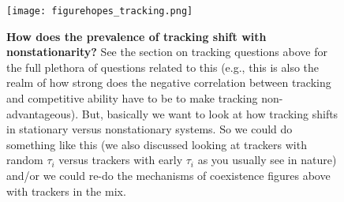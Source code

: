 \documentclass[11pt,a4paper,oneside]{article}
\begin{document}
\newpage
\begin{figure}[h!]
\centering
\noindent \texttt{[image: figurehopes\_tracking.png]}
\caption{{\bf How does the prevalence of tracking shift with nonstationarity?} See the section on tracking questions above for the full plethora of questions related to this (e.g., this is also the realm of how strong does the negative correlation between tracking and competitive ability have to be to make tracking non-advantageous). But, basically we want to look at how tracking shifts in stationary versus nonstationary systems. So we could do something like this (we also discussed looking at trackers with random \(\tau_{i}\) versus trackers with early \(\tau_{i}\) as you usually see in nature) and/or we could re-do the mechanisms of coexistence figures above with trackers in the mix.}
\end{figure}
\end{document}
